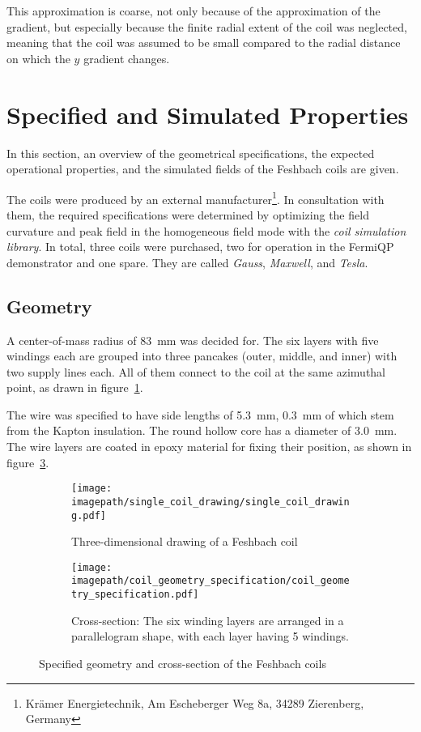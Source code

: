 This approximation is coarse, not only because of the approximation of the gradient, but especially because the finite radial extent of the coil was neglected, meaning that the coil was assumed to be small compared to the radial distance on which the $y$ gradient changes.


\section{Specified and Simulated Properties}\label{ch:coil_properties}
In this section, an overview of the geometrical specifications, the expected operational properties, and the simulated fields of the Feshbach coils are given.

The coils were produced by an external manufacturer\footnote{Krämer Energietechnik, Am Escheberger Weg 8a, 34289 Zierenberg, Germany}. In consultation with them, the required specifications were determined by optimizing the field curvature and peak field in the homogeneous field mode with the \textit{coil simulation library}. In total, three coils were purchased, two for operation in the FermiQP demonstrator and one spare. They are called \textit{Gauss}, \textit{Maxwell}, and \textit{Tesla}.


\subsection*{Geometry}
A center-of-mass radius of \SI{83}{\milli\meter} was decided for. The six layers with five windings each are grouped into three pancakes (outer, middle, and inner) with two supply lines each. All of them connect to the coil at the same azimuthal point, as drawn in figure~\ref{fig:single_coil_drawing}. 

The wire was specified to have side lengths of \SI{5.3}{\milli\meter}, \SI{0.3}{\milli\meter} of which stem from the Kapton insulation. The round hollow core has a diameter of \SI{3.0}{\milli\meter}. The wire layers are coated in epoxy material for fixing their position, as shown in figure~\ref{fig:coil_geometry_specification}.

\begin{figure}
    \centering
    \begin{subfigure}[t]{0.48\textwidth}
        \centering
        \texttt{[image: \\imagepath/single\_coil\_drawing/single\_coil\_drawing.pdf]}
        \caption{Three-dimensional drawing of a Feshbach coil}
        \label{fig:single_coil_drawing}
    \end{subfigure}
    \hspace{0.03\textwidth}
    \begin{subfigure}[t]{0.48\textwidth}
        \centering
        \texttt{[image: \\imagepath/coil\_geometry\_specification/coil\_geometry\_specification.pdf]}
        \caption{Cross-section: The six winding layers are arranged in a parallelogram shape, with each layer having 5 windings.}
        \label{fig:coil_geometry_specification}
    \end{subfigure}
    \caption{Specified geometry and cross-section of the Feshbach coils}
\end{figure}

